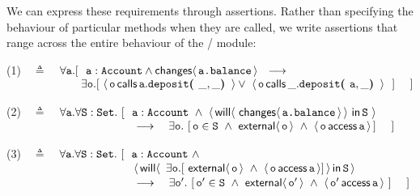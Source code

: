  
We can  express these  requirements  %
through \Chainmail assertions.  Rather than %
specifying the behaviour of particular methods when they are called, we
write  assertions   that range across the entire behaviour of the
/  module:%
\vspace{.2cm}


(1)\ \  $\triangleq$\ \ $\forall \prg{a}.[\ \ \prg{a}:\prg{Account} \wedge \Changes{\prg{a.balance}}  \ \    
    \longrightarrow \ \    \hfill$ \\
  $\strut \hspace{2.3cm} 
  \exists \prg{o}. [\    \Calls{\prg{o}}{\prg{deposit}}{\prg{a}}{\_,\_} \vee\  \Calls{\prg{o}}{\prg{deposit}}{\_}{\prg{a},\_}\  \ ] \ \ \ \ ] \hfill $

\vspace{.4cm}

    (2)\ \  $\triangleq$\ \ $\forall {\mbox{\tt{a}}}.\forall {\mbox{\tt{S}}}:{\mbox{\tt{Set}}}.\ [  \ \  {\mbox{\tt{a}}}:{\mbox{\tt{Account}}}\ \wedge \  \langle\,  {\mathsf{will}}\langle \,\,{\mathsf{changes}}\langle\,{\mbox{\tt{a.balance}}}\,\rangle\,\rangle \,\, \mathsf{in}\, {\mbox{\tt{S}}}\,\, \rangle$\\
 $\strut \hspace{3.9cm} \hfill \longrightarrow \ \ \                     \exists \prg{o}.\ [\, \prg{o}\in \prg{S}\ \wedge\  \External{\prg{o}}  \ \wedge \ \CanAccess{\prg{o}}{\prg{a}} \, ] \ \ \ \ ]$
\vspace{.4cm} 
 
     (3)\ \  $\triangleq$\ \ $\forall {\mbox{\tt{a}}}.\forall {\mbox{\tt{S}}}:{\mbox{\tt{Set}}}.\ [ \ \  {\mbox{\tt{a}}}:{\mbox{\tt{Account}}}\ \wedge$\\
     $\strut \hspace{3.7cm} \ \ {\Using{\Future{\ \exists \prg{o}.[\ \External{\prg{o}} \ \wedge\ \CanAccess{\prg{o}}{\prg{a}}]}}{\SF}}$ \\  
 $\strut \hspace{3.9cm} \hfill   \longrightarrow \ \ \ \exists \prg{o}'.\ [\, \prg{o}'\in \prg{S}\  \wedge  \ \External{\prg{o}'}  \ \wedge \ \CanAccess{\prg{o}'}{\prg{a}}   \ ] \ \ \ \ ]$

\vspace{.2cm}

